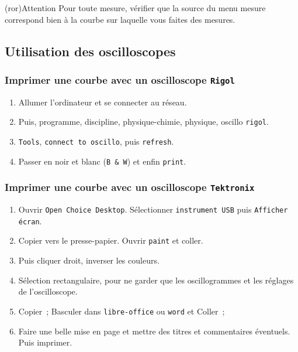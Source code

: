 \documentclass[../main/main.tex]{subfiles}
\begin{document}
\begin{tcb}[width=\linewidth](ror){Attention}
	Pour toute mesure, vérifier que la source du menu mesure correspond bien à
	la courbe sur laquelle vous faites des mesures.
\end{tcb}

\subsection{Utilisation des oscilloscopes}
\subsubsection{Imprimer une courbe avec un oscilloscope \texttt{Rigol}}

\begin{enumerate}
	\item Allumer l'ordinateur et se connecter au réseau.
	\item Puis, programme, discipline, physique-chimie, physique, oscillo
	      \texttt{rigol}.
	\item \texttt{Tools}, \texttt{connect to oscillo}, puis \texttt{refresh}.
	\item Passer en noir et blanc (\texttt{B \& W}) et enfin \texttt{print}.
\end{enumerate}


\subsubsection{Imprimer une courbe avec un oscilloscope \texttt{Tektronix}}

\begin{enumerate}
	\item Ouvrir \texttt{Open Choice Desktop}. Sélectionner \texttt{instrument
		      USB} puis \texttt{Afficher écran}.
	\item Copier vers le presse-papier. Ouvrir \texttt{paint} et coller.
	\item Puis cliquer droit, inverser les couleurs.
	\item Sélection rectangulaire, pour ne garder que les oscillogrammes et les
	      réglages de l'oscilloscope.
	\item Copier~; Basculer dans \texttt{libre-office} ou \texttt{word} et
	      Coller~;
	\item Faire une belle mise en page et mettre des titres et commentaires
	      éventuels. Puis imprimer.
\end{enumerate}
\end{document}
